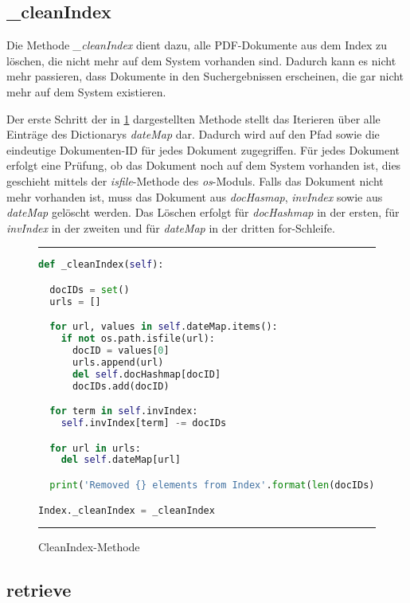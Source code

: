 \subsection{\_cleanIndex}\label{cleanIndex}
Die Methode \textit{\_cleanIndex} dient dazu, alle PDF-Dokumente aus dem Index zu löschen, die nicht mehr auf dem System vorhanden sind. Dadurch kann es nicht mehr passieren, dass Dokumente in den Suchergebnissen erscheinen, die gar nicht mehr auf dem System existieren.

Der erste Schritt der in \ref{fig:cleanIndex} dargestellten Methode stellt das Iterieren über alle Einträge des Dictionarys \textit{dateMap} dar. Dadurch wird auf den Pfad sowie die eindeutige Dokumenten-ID für jedes Dokument zugegriffen.
Für jedes Dokument erfolgt eine Prüfung, ob das Dokument noch auf dem System vorhanden ist, dies geschieht mittels der \textit{isfile}-Methode des \textit{os}-Moduls. Falls das Dokument nicht mehr vorhanden ist, muss das Dokument aus \textit{docHasmap}, \textit{invIndex} sowie aus \textit{dateMap} gelöscht werden. 
Das Löschen erfolgt für \textit{docHashmap} in der ersten, für \textit{invIndex} in der zweiten und für \textit{dateMap} in der dritten for-Schleife.


\begin{figure}
	\rule{\textwidth}{0.4pt}
	\begin{lstlisting}[language=Python]
def _cleanIndex(self):

  docIDs = set()
  urls = []

  for url, values in self.dateMap.items():
    if not os.path.isfile(url):
      docID = values[0]
      urls.append(url)
      del self.docHashmap[docID]
      docIDs.add(docID)

  for term in self.invIndex:
    self.invIndex[term] -= docIDs

  for url in urls:
    del self.dateMap[url]

  print('Removed {} elements from Index'.format(len(docIDs)))

Index._cleanIndex = _cleanIndex

	\end{lstlisting}
	\rule{\textwidth}{0.4pt}
	\caption{CleanIndex-Methode}
	\label{fig:cleanIndex}
\end{figure}

\subsection{retrieve}\label{retrieve}

